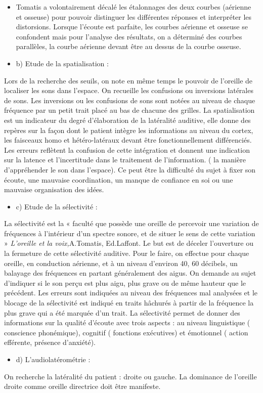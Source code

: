 \documentclass[12pt,french]{report}
\makeatletter
\let\SF@@footnote\footnote
\def\footnote{\ifx\protect\@typeset@protect
    \expandafter\SF@@footnote
  \else
    \expandafter\SF@gobble@opt
  \fi
}
\edef\SF@gobble@opt{\noexpand\protect
  \expandafter\noexpand\csname SF@gobble@opt \endcsname}
\makeatother
\begin{document}
\footnote{\begin{itemize}
\item Tomatis a volontairement décalé les étalonnages des deux courbes (aérienne
et osseuse) pour pouvoir distinguer les différentes réponses et interpréter
les distorsions. Lorsque l\textquoteright écoute est parfaite, les
courbes aérienne et osseuse se confondent mais pour l'analyse des
résultats, on a déterminé des courbes parallèles, la courbe aérienne
devant être au dessus de la courbe osseuse.
\end{itemize}
}
\begin{itemize}
\item b) Etude de la spatialisation :
\end{itemize}
Lors de la recherche des seuils, on note en même temps le pouvoir
de l'oreille de localiser les sons dans l'espace. On recueille les
confusions ou inversions latérales de sons. Les inversions ou les
confusions de sons sont notées au niveau de chaque fréquence par un
petit trait placé au bas de chacune des grilles. La spatialisation
est un indicateur du degré d'élaboration de la latéralité auditive,
elle donne des repères sur la façon dont le patient intègre les informations
au niveau du cortex, les faisceaux homo et hétéro-latéraux devant
être fonctionnellement différenciés. Les erreurs reflètent la confusion
de cette intégration et donnent une indication sur la latence et l'incertitude
dans le traitement de l'information. ( la manière d'appréhender le
son dans l'espace). Ce peut être la difficulté du sujet à fixer son
écoute, une mauvaise coordination, un manque de confiance en soi ou
une mauvaise organisation des idées.
\begin{itemize}
\item c) Etude de la sélectivité : 
\end{itemize}
La sélectivité est la « faculté que possède une oreille de percevoir
une variation de fréquences à l'intérieur d'un spectre sonore, et
de situer le sens de cette variation »\footnote{\emph{L'oreille et la voix,}A.Tomatis, Ed.Laffont}.
Le but est de déceler l'ouverture ou la fermeture de cette sélectivité
auditive. Pour le faire, on effectue pour chaque oreille, en conduction
aérienne, et à un niveau d'environ 40, 60 décibels, un balayage des
fréquences en partant généralement des aigus. On demande au sujet
d'indiquer si le son perçu est plus aigu, plus grave ou de même hauteur
que le précédent. Les erreurs sont indiquées au niveau des fréquences
mal analysées et le blocage de la sélectivité est indiqué en traits
hâchurés à partir de la fréquence la plus grave qui a été marquée
d'un trait. La sélectivité permet de donner des informations sur la
qualité d'écoute avec trois aspects : au niveau linguistique ( conscience
phonémique), cognitif ( fonctions exécutives) et émotionnel ( action
efférente, présence d'anxiété).
\begin{itemize}
\item d) L'audiolatérométrie : 
\end{itemize}
On recherche la latéralité du patient : droite ou gauche. La dominance
de l'oreille droite comme oreille directrice doit être manifeste.
\end{document}
